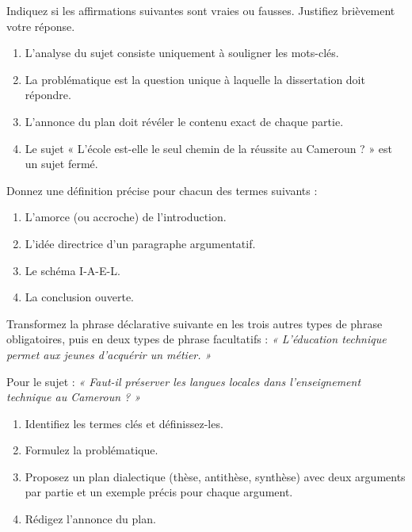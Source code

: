 \documentclass[11pt]{article}
\newcounter{popsec}
\newcounter{popsub}
\newcommand{\courssub}[1]{%
  \stepcounter{popsub}%
  \par\vspace{9pt}\noindent{\popxbold\fontsize{11.5}{13}\selectfont\color{popink}{\color{poporange}\thepopsec.\thepopsub}\hspace{6pt}#1}\par\nopagebreak\vspace{4pt}
}
\begin{document}
\begin{exercice}
Indiquez si les affirmations suivantes sont vraies ou fausses. Justifiez brièvement votre réponse.
\begin{enumerate}
\item L'analyse du sujet consiste uniquement à souligner les mots-clés.
\item La problématique est la question unique à laquelle la dissertation doit répondre.
\item L'annonce du plan doit révéler le contenu exact de chaque partie.
\item Le sujet « L'école est-elle le seul chemin de la réussite au Cameroun ? » est un sujet fermé.
\end{enumerate}
\end{exercice}

\begin{exercice}
Donnez une définition précise pour chacun des termes suivants :
\begin{enumerate}
\item L'amorce (ou accroche) de l'introduction.
\item L'idée directrice d'un paragraphe argumentatif.
\item Le schéma I-A-E-L.
\item La conclusion ouverte.
\end{enumerate}
\end{exercice}

\begin{exercice}
Transformez la phrase déclarative suivante en les trois autres types de phrase obligatoires, puis en deux types de phrase facultatifs :
\emph{« L'éducation technique permet aux jeunes d'acquérir un métier. »}
\end{exercice}

\courssub{Je m'entraîne}

\begin{exercice}
Pour le sujet : \emph{« Faut-il préserver les langues locales dans l'enseignement technique au Cameroun ? »}
\begin{enumerate}
\item Identifiez les termes clés et définissez-les.
\item Formulez la problématique.
\item Proposez un plan dialectique (thèse, antithèse, synthèse) avec deux arguments par partie et un exemple précis pour chaque argument.
\item Rédigez l'annonce du plan.
\end{enumerate}
\end{exercice}
\end{document}
